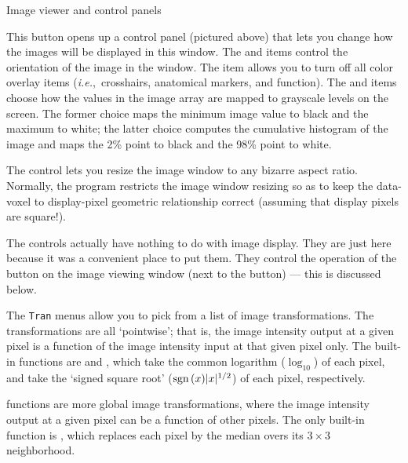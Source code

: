 \goodbreak\begin{samepage}
\centerline{\epsfysize=3.9in\blob\blob
            \epsfxsize=1.9in}\vspace{1ex}
\centerline{\sf Image viewer  and  control panels}
\end{samepage}\goodbreak

This button opens up a control panel (pictured above) that lets you change how the
images will be displayed in this window.
The  and  items control the orientation
of the image in the window.  The  item allows
you to turn off all color overlay items ({\it i.e.},~crosshairs,
anatomical markers, and function).
The  and  items choose how the
values in the image array are mapped to grayscale levels on
the screen.  The former choice maps the minimum image value
to black and the maximum to white; the latter choice computes
the cumulative histogram of the image and maps the 2\% point to black and
the 98\% point to white.

The  control lets you resize the image window to
any bizarre aspect ratio.  Normally, the program restricts the
image window resizing so as to keep the data-voxel to display-pixel
geometric relationship correct (assuming that display pixels are square!).

The  controls actually have nothing to do with image display.
They are just here because it was a convenient place to put them.
They control the operation of the  button on the image
viewing window (next to the  button) --- this is discussed
below.

The {\tt Tran} menus allow you to pick from a list of image
transformations.
The  transformations are all `pointwise'; that is, the
image intensity output at a given pixel is a function of the
image intensity input at that given pixel only.  The built-in
 functions are  and , which
take the common logarithm ($\log_{10}$) of each pixel, and
take the `signed square root' ($\hbox{sgn}\,(x) |x|^{1/2}$) of each pixel,
respectively.

 functions are more global image transformations,
where the image intensity output at a given pixel can be a function
of other pixels.  The only built-in  function is
, which replaces each pixel by the median overs
its $3\times3$ neighborhood.

